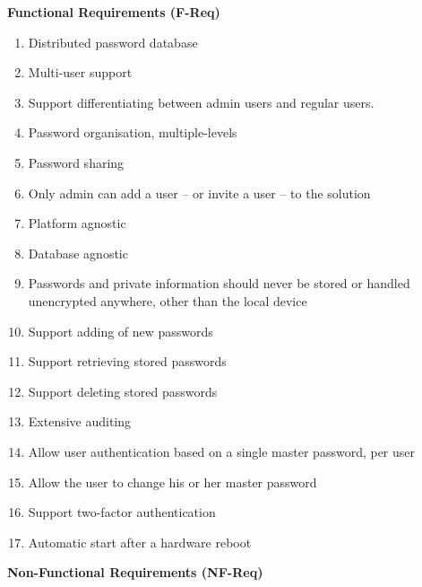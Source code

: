 				\textbf{Functional Requirements (F-Req)}
					\vspace{-3ex}\begin{enumerate}
						 \setlength\itemsep{0.1em}
						\item Distributed password database \label{item:distrib_password}
						\item Multi-user support \label{item:multi_user}
						\item Support differentiating between admin users and regular users. \label{item:admin_user}
						\item Password organisation, multiple-levels \label{item:organization}
						\item Password sharing \label{item:sharing}
						\item Only admin can add a user -- or invite a user -- to the solution \label{item:add}
						\item Platform agnostic \label{item:platform}
						\item Database agnostic \label{item:database}
						\item Passwords and private information should never be stored or handled unencrypted anywhere, other than the local device \label{item:passwords_local}
						\item Support adding of new passwords \label{item:new}
						\item Support retrieving stored passwords \label{item:retrieve}
						\item Support deleting stored passwords \label{item:delete}
						\item Extensive auditing \label{item:audit}
						\item Allow user authentication based on a single master password, per user \label{item:auth}
						\item Allow the user to change his or her master password \label{item:change}
						\item Support two-factor authentication \label{item:two-factor}
						\item Automatic start after a hardware reboot \label{item:restart}
					\end{enumerate}
				\textbf{Non-Functional Requirements (NF-Req)}
